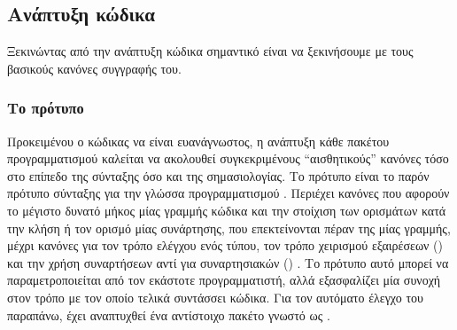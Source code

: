 \subsection{Ανάπτυξη κώδικα}
Ξεκινώντας από την ανάπτυξη κώδικα σημαντικό είναι να ξεκινήσουμε με τους βασικούς κανόνες συγγραφής του.
\subsubsection{Το πρότυπο }
Προκειμένου ο κώδικας να είναι ευανάγνωστος, η ανάπτυξη κάθε πακέτου προγραμματισμού  καλείται να ακολουθεί συγκεκριμένους ``αισθητικούς'' κανόνες τόσο στο επίπεδο της σύνταξης όσο και της σημασιολογίας.
Το πρότυπο  είναι το παρόν πρότυπο σύνταξης για την γλώσσα προγραμματισμού .
Περιέχει κανόνες που αφορούν το μέγιστο δυνατό μήκος μίας γραμμής κώδικα και την στοίχιση των ορισμάτων κατά την κλήση ή τον ορισμό μίας συνάρτησης, που επεκτείνονται πέραν της μίας γραμμής, μέχρι κανόνες για τον τρόπο ελέγχου ενός τύπου, τον τρόπο χειρισμού εξαιρέσεων () και την χρήση συναρτήσεων αντί για συναρτησιακών () \cite{PEP8}.
Το πρότυπο αυτό μπορεί να παραμετροποιείται από τον εκάστοτε προγραμματιστή, αλλά εξασφαλίζει μία συνοχή στον τρόπο με τον οποίο τελικά συντάσσει κώδικα.
Για τον αυτόματο έλεγχο του παραπάνω, έχει αναπτυχθεί ένα αντίστοιχο πακέτο γνωστό ως \href{https://pypi.org/project/flake8/}{}.
